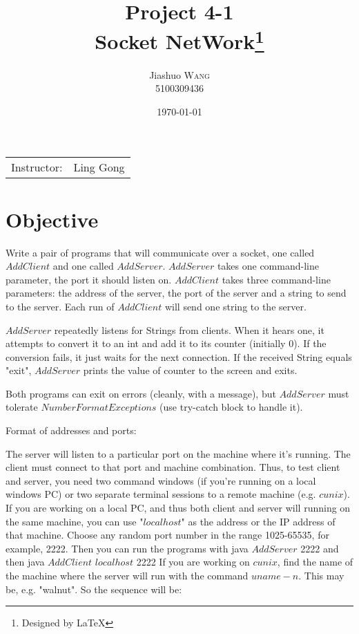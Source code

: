 \documentclass{article}
\title{Project 4-1 \\ Socket NetWork\thanks{Designed by \LaTeX}} %
\author{Jiashuo \textsc{Wang} \\ 5100309436} %
\date{\today} %
\begin{document}
\maketitle %
\thispagestyle{fancy} %

\begin{center}
\begin{tabular}{l r}
Instructor: & Ling Gong %
\end{tabular}
\end{center}




\section{Objective}

Write a pair of programs that will communicate over a socket, one called $AddClient$ and one called $AddServer$. $AddServer$ takes one command-line parameter, the port it should listen on. $AddClient$ takes three command-line parameters: the address of the server, the port of the server and a string to send to the server.
Each run of $AddClient$ will send one string to the server.

$AddServer$ repeatedly listens for Strings from clients. When it hears one, it attempts to convert it to an int and add it to its counter (initially 0). If the conversion fails, it just waits for the next connection. If the received String equals "exit", $AddServer$ prints the value of counter to the screen and exits.

Both programs can exit on errors (cleanly, with a message), but $AddServer$ must tolerate $NumberFormatExceptions$ (use try-catch block to handle it).

Format of addresses and ports:

The server will listen to a particular port on the machine where it's running. The client must connect to that port and machine combination. Thus, to test client and server, you need two command windows (if you're running on a local windows PC) or two separate terminal sessions to a remote machine (e.g. $cunix$).
If you are working on a local PC, and thus both client and server will running on the same machine, you can use "$localhost$" as the address or the IP address of that machine. Choose any random port number in the range 1025-65535, for example, 2222. Then you can run the programs with java $AddServer$ 2222 and then java $AddClient$ $localhost$ 2222
If you are working on $cunix$, find the name of the machine where the server will run with the command $uname -n$. This may be, e.g. "walnut". So the sequence will be:
\end{document}
